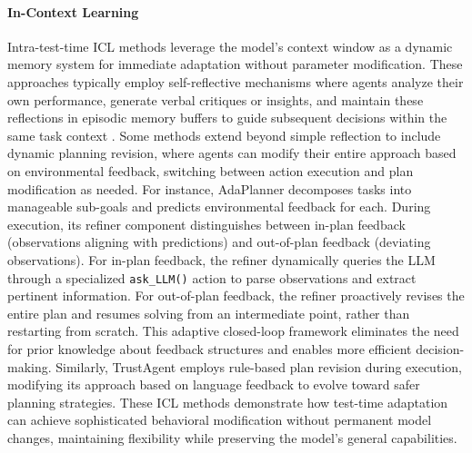 \documentclass[10pt]{article} %
\begin{document}
\paragraph{In-Context Learning} Intra-test-time ICL methods leverage the model's context window as a dynamic memory system for immediate adaptation without parameter modification. These approaches typically employ self-reflective mechanisms where agents analyze their own performance, generate verbal critiques or insights, and maintain these reflections in episodic memory buffers to guide subsequent decisions within the same task context \citep{shinn2023reflexion, madaan2023self_refine}. Some methods extend beyond simple reflection to include dynamic planning revision, where agents can modify their entire approach based on environmental feedback, switching between action execution and plan modification as needed. For instance, AdaPlanner \citep{sun2023adaplanner} decomposes tasks into manageable sub-goals and predicts environmental feedback for each. During execution, its refiner component distinguishes between in-plan feedback (observations aligning with predictions) and out-of-plan feedback (deviating observations). For in-plan feedback, the refiner dynamically queries the LLM through a specialized \texttt{ask\_LLM()} action to parse observations and extract pertinent information. For out-of-plan feedback, the refiner proactively revises the entire plan and resumes solving from an intermediate point, rather than restarting from scratch. This adaptive closed-loop framework eliminates the need for prior knowledge about feedback structures and enables more efficient decision-making. Similarly, TrustAgent \citep{hua2024trustagent} employs rule-based plan revision during execution, modifying its approach based on language feedback to evolve toward safer planning strategies. These ICL methods demonstrate how test-time adaptation can achieve sophisticated behavioral modification without permanent model changes, maintaining flexibility while preserving the model's general capabilities.
\end{document}
